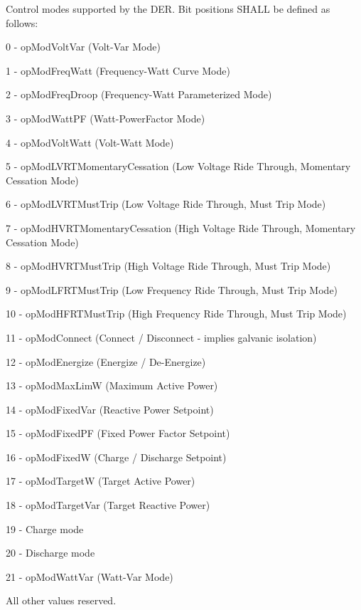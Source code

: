 Control modes supported by the D\+ER. Bit positions S\+H\+A\+LL be defined as follows\+:

0 -\/ op\+Mod\+Volt\+Var (Volt-\/\+Var Mode)

1 -\/ op\+Mod\+Freq\+Watt (Frequency-\/\+Watt Curve Mode)

2 -\/ op\+Mod\+Freq\+Droop (Frequency-\/\+Watt Parameterized Mode)

3 -\/ op\+Mod\+Watt\+PF (Watt-\/\+Power\+Factor Mode)

4 -\/ op\+Mod\+Volt\+Watt (Volt-\/\+Watt Mode)

5 -\/ op\+Mod\+L\+V\+R\+T\+Momentary\+Cessation (Low Voltage Ride Through, Momentary Cessation Mode)

6 -\/ op\+Mod\+L\+V\+R\+T\+Must\+Trip (Low Voltage Ride Through, Must Trip Mode)

7 -\/ op\+Mod\+H\+V\+R\+T\+Momentary\+Cessation (High Voltage Ride Through, Momentary Cessation Mode)

8 -\/ op\+Mod\+H\+V\+R\+T\+Must\+Trip (High Voltage Ride Through, Must Trip Mode)

9 -\/ op\+Mod\+L\+F\+R\+T\+Must\+Trip (Low Frequency Ride Through, Must Trip Mode)

10 -\/ op\+Mod\+H\+F\+R\+T\+Must\+Trip (High Frequency Ride Through, Must Trip Mode)

11 -\/ op\+Mod\+Connect (Connect / Disconnect -\/ implies galvanic isolation)

12 -\/ op\+Mod\+Energize (Energize / De-\/\+Energize)

13 -\/ op\+Mod\+Max\+LimW (Maximum Active Power)

14 -\/ op\+Mod\+Fixed\+Var (Reactive Power Setpoint)

15 -\/ op\+Mod\+Fixed\+PF (Fixed Power Factor Setpoint)

16 -\/ op\+Mod\+FixedW (Charge / Discharge Setpoint)

17 -\/ op\+Mod\+TargetW (Target Active Power)

18 -\/ op\+Mod\+Target\+Var (Target Reactive Power)

19 -\/ Charge mode

20 -\/ Discharge mode

21 -\/ op\+Mod\+Watt\+Var (Watt-\/\+Var Mode)

All other values reserved. 